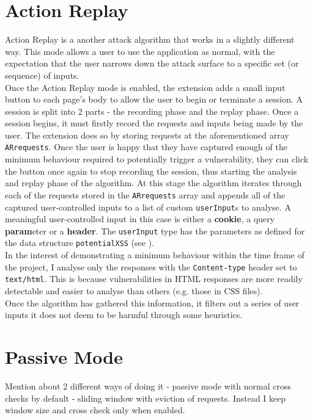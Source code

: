 \section{Action Replay}

Action Replay is a another attack algorithm that works in a slightly different way. This mode allows a user to use the application as normal, with the expectation that the user narrows down the attack surface to a specific set (or sequence) of inputs. \\

Once the Action Replay mode is enabled, the extension adds a small input button to each page's body to allow the user to begin or terminate a session. A session is split into 2 parts - the recording phase and the replay phase. Once a session begins, it must firstly record the requests and inputs being made by the user. The extension does so by storing requests at the aforementioned array \texttt{ARrequests}. Once the user is happy that they have captured enough of the minimum behaviour required to potentially trigger a vulnerability, they can click the button once again to stop recording the session, thus starting the analysis and replay phase of the algorithm. At this stage the algorithm iterates through each of the requests stored in the \texttt{ARrequests} array and appends all of the captured user-controlled inputs to a list of custom \texttt{userInput}s to analyse. A meaningful user-controlled input in this case is either a \textbf{cookie}, a query \textbf{param}eter or a \textbf{header}. The \texttt{userInput} type has the parameters as defined for the data structure \texttt{potentialXSS} (see \label{storageSpecs}). \\

In the interest of demonstrating a minimum behaviour within the time frame of the project, I analyse only the responses with the \texttt{Content-type} header set to \texttt{text/html}. This is because vulnerabilities in HTML responses are more readily detectable and easier to analyse than others (e.g. those in CSS files). \\

Once the algorithm has gathered this information, it filters out a series of user inputs it does not deem to be harmful through some heuristics.


\section{Passive Mode}

Mention about 2 different ways of doing it - passive mode with normal cross checks by default - sliding window with eviction of requests.
Instead I keep window size and cross check only when enabled.

